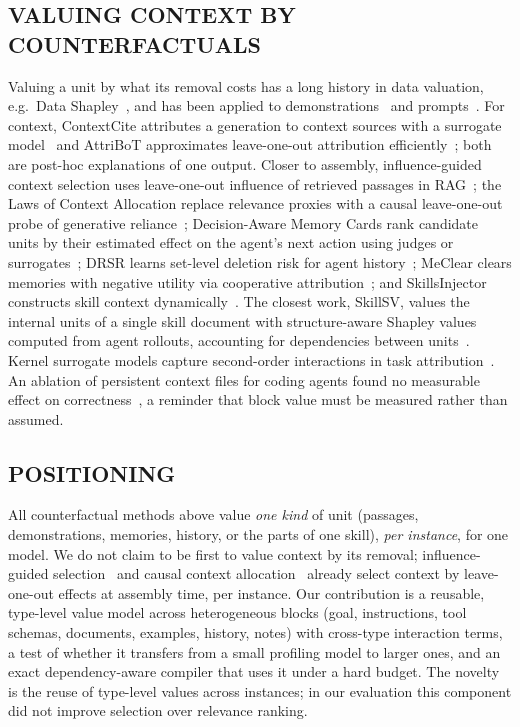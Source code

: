 \subsection{VALUING CONTEXT BY COUNTERFACTUALS}
Valuing a unit by what its removal costs has a long history in data valuation, e.g.\ Data Shapley~\cite{datashapley2019},
and has been applied to demonstrations~\cite{demoshapley2024} and prompts~\cite{promptshapley2023}. For context,
ContextCite attributes a generation to context sources with a surrogate model~\cite{contextcite2024} and AttriBoT
approximates leave-one-out attribution efficiently~\cite{attribot2024}; both are post-hoc explanations of one output.
Closer to assembly, influence-guided context selection uses leave-one-out influence of retrieved passages in
RAG~\cite{civalue2025}; the Laws of Context Allocation replace relevance proxies with a causal leave-one-out probe of
generative reliance~\cite{ctxalloc2026}; Decision-Aware Memory Cards rank candidate units by their estimated effect on the
agent's next action using judges or surrogates~\cite{cicl2026}; DRSR learns set-level deletion risk for agent
history~\cite{drsr2026}; MeClear clears memories with negative utility via cooperative attribution~\cite{meclear2026}; and
SkillsInjector constructs skill context dynamically~\cite{skillsinjector2026}. The closest work, SkillSV, values the
internal units of a single skill document with structure-aware Shapley values computed from agent rollouts, accounting for
dependencies between units~\cite{skillsv2026}. Kernel surrogate models capture second-order interactions in task
attribution~\cite{kernelsurrogate2026}. An ablation of persistent context files for coding agents found no measurable
effect on correctness~\cite{ctxfiles2026}, a reminder that block value must be measured rather than assumed.

\subsection{POSITIONING}
All counterfactual methods above value \emph{one kind} of unit (passages, demonstrations, memories, history, or the parts
of one skill), \emph{per instance}, for one model. We do not claim to be first to value context by its removal; influence-guided selection~\cite{civalue2025} and
causal context allocation~\cite{ctxalloc2026} already select context by leave-one-out effects at assembly time, per
instance. Our
contribution is a reusable, type-level value model across heterogeneous blocks (goal, instructions, tool schemas,
documents, examples, history, notes) with cross-type interaction terms, a test of whether it transfers from a small
profiling model to larger ones, and an exact dependency-aware compiler that uses it under a hard budget. The novelty is the reuse of type-level values
across instances; in our evaluation this component did not improve selection over relevance ranking.
